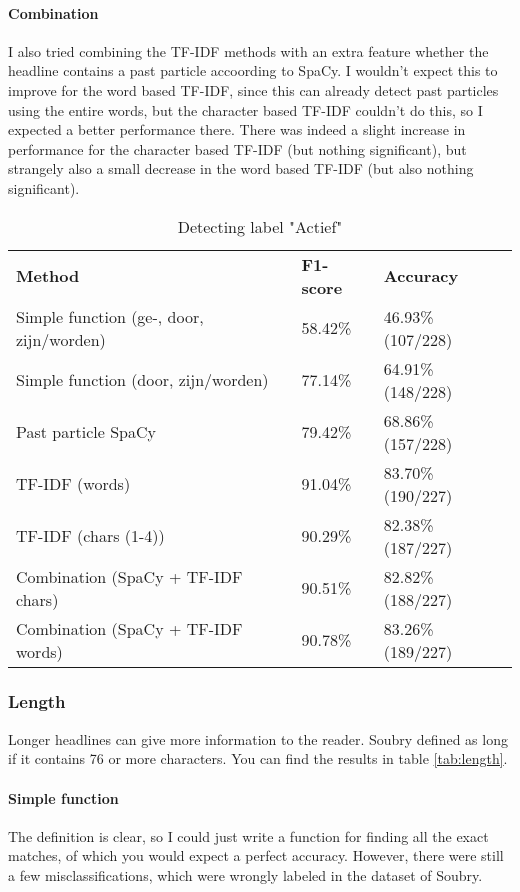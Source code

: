 \documentclass{article}
\begin{document}
\paragraph{Combination} I also tried combining the TF-IDF methods with an extra feature whether the headline contains a past particle accoording to SpaCy. I wouldn't expect this to improve for the word based TF-IDF, since this can already detect past particles using the entire words, but the character based TF-IDF couldn't do this, so I expected a better performance there. There was indeed a slight increase in performance for the character based TF-IDF (but nothing significant), but strangely also a small decrease in the word based TF-IDF (but also nothing significant).


\begin{table}[]
\begin{tabular}{lll}
\textbf{Method}                          & \textbf{F1-score} & \textbf{Accuracy} \\
Simple function (ge-, door, zijn/worden) & 58.42\%           & 46.93\% (107/228) \\
Simple function (door, zijn/worden)      & 77.14\%           & 64.91\% (148/228) \\
Past particle SpaCy                      & 79.42\%           & 68.86\% (157/228) \\
TF-IDF (words)                           & 91.04\%           & 83.70\% (190/227) \\
TF-IDF (chars (1-4))                     & 90.29\%           & 82.38\% (187/227) \\
Combination (SpaCy + TF-IDF chars)       & 90.51\%           & 82.82\% (188/227) \\
Combination (SpaCy + TF-IDF words)       & 90.78\%           & 83.26\% (189/227)
\end{tabular}
\caption{Detecting label "Actief"}
\label{tab:activity}
\end{table}

\subsubsection{Length}
Longer headlines can give more information to the reader. Soubry defined as long if it contains 76 or more characters. \cite{soubry} You can find the results in table \ref{tab:length}.

\paragraph{Simple function} The definition is clear, so I could just write a function for finding all the exact matches, of which you would expect a perfect accuracy. However, there were still a few misclassifications, which were wrongly labeled in the dataset of Soubry.
\end{document}
